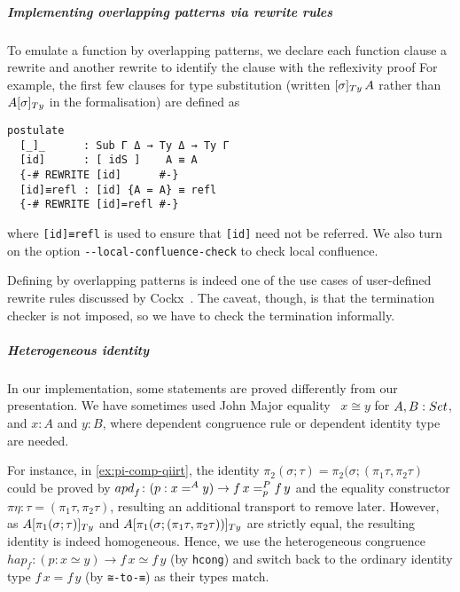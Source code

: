 \documentclass[a4paper,UKenglish,numberwithinsect,cleveref,thm-restate]{lipics-v2021}
\begin{document}
\subparagraph*{Implementing overlapping patterns via rewrite rules}
To emulate a function by overlapping patterns, we declare each function clause a rewrite and another rewrite to identify the clause with the reflexivity proof
For example, the first few clauses for type substitution (written $[\sigma]_{\Ty}\,A$ rather than $\subTy{A}{\sigma}$ in the formalisation) are defined as
\begin{lstlisting}
postulate
  [_]_      : Sub Γ Δ → Ty Δ → Ty Γ
  [id]      : [ idS ]    A ≡ A
  {-# REWRITE [id]      #-}
  [id]≡refl : [id] {A = A} ≡ refl
  {-# REWRITE [id]=refl #-}
\end{lstlisting}
where \lstinline|[id]≡refl| is used to ensure that \lstinline|[id]| need not be referred.
We also turn on the option \texttt{-{}-local-confluence-check} to check local confluence.


Defining by overlapping patterns is indeed one of the use cases of user-defined rewrite rules discussed by Cockx~\cite{Cockx2020}. 
The caveat, though, is that the termination checker is not imposed, so we have to check the termination informally.

\subparagraph*{Heterogeneous identity}
In our implementation, some statements are proved differently from our presentation. 
We have sometimes used John Major equality~\cite{McBride1999} $x \cong y$  for $A, B : \Set$, and $x : A$ and $y : B$, where dependent congruence rule or dependent identity type are needed.

For instance, in \cref{ex:pi-comp-qiirt}, the identity $\pi_2(\sigma ; \tau) = \pi_2(\sigma; (\pi_1 \tau, \pi_2 \tau)$ could be proved by $\apdfunc f \colon (p : x =^A y) \to f\,x =^{P}_{p} f\,y$ and the equality constructor $\pi\eta : \tau = (\pi_1\tau, \pi_2\tau)$, resulting an additional transport to remove later.
However, as $\subTy{A}{\pi_1(\sigma; \tau)}$ and $\subTy{A}{\pi_1(\sigma; (\pi_1\tau, \pi_2\tau))}$ are strictly equal, the resulting identity is indeed homogeneous.
Hence, we use the heterogeneous congruence $\mathit{hap}_f\colon (p : x \simeq y) \to f\,x\simeq f\,y$ (by \lstinline|hcong|) and switch back to the ordinary identity type $f\,x = f\, y$ (by \lstinline|≅-to-≡|) as their types match.
 
\end{document}
